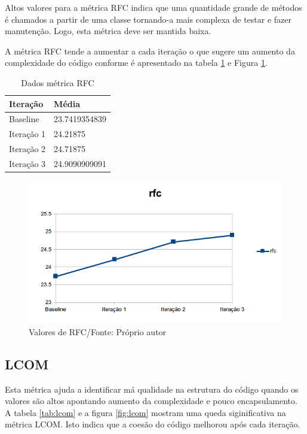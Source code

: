 Altos valores para a métrica RFC indica que uma quantidade grande de métodos é
chamados a partir de uma classe tornando-a mais complexa de testar e fazer
manutenção. Logo, esta métrica deve ser mantida baixa.

A métrica RFC tende a aumentar a cada iteração o que sugere um aumento da
complexidade do código conforme é apresentado na tabela \ref{tab:rfc} e Figura
\ref{fig:rfc}.

\begin{table}[h]
	\centering
    \begin{tabular}{ | l | l | }
    \hline
    Iteração & Média 			\\ \hline
    Baseline & 23.7419354839   	\\ \hline
    Iteração 1 & 24.21875		\\ \hline
	Iteração 2 & 24.71875		\\ \hline
	Iteração 3 & 24.9090909091	\\ \hline
    \end{tabular}
    \caption{Dados métrica RFC}
    \label{tab:rfc}
\end{table}

\begin{figure}[h]
	\centering
	\includegraphics{img/rfc.png}
	\caption{Valores de RFC/Fonte: Próprio autor}
	\label{fig:rfc}
\end{figure}

\subsection{LCOM}

Esta métrica ajuda a identificar má qualidade na estrutura do código quando os
valores são altos apontando aumento da complexidade e pouco encapsulamento.
A tabela \ref{tab:lcom} e a figura \ref{fig:lcom} mostram uma queda
siginificativa na métrica LCOM.
Isto indica que a coesão do código melhorou após cada iteração. 

